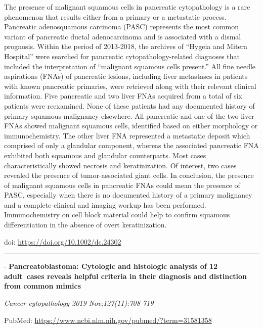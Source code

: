 \documentclass[
]{article}
\renewcommand{\linethickness}{0.05em}
\begin{document}
The presence of malignant squamous cells in pancreatic cytopathology is
a rare phenomenon that results either from a primary or a metastatic
process. Pancreatic adenosquamous carcinoma (PASC) represents the most
common variant of pancreatic ductal adenocarcinoma and is associated
with a dismal prognosis. Within the period of 2013-2018, the archives of
``Hygeia and Mitera Hospital'' were searched for pancreatic
cytopathology-related diagnoses that included the interpretation of
``malignant squamous cells present.'' All fine needle aspirations (FNAs)
of pancreatic lesions, including liver metastases in patients with known
pancreatic primaries, were retrieved along with their relevant clinical
information. Five pancreatic and two liver FNAs acquired from a total of
six patients were reexamined. None of these patients had any documented
history of primary squamous malignancy elsewhere. All pancreatic and one
of the two liver FNAs showed malignant squamous cells, identified based
on either morphology or immunochemistry. The other liver FNA represented
a metastatic deposit which comprised of only a glandular component,
whereas the associated pancreatic FNA exhibited both squamous and
glandular counterparts. Most cases characteristically showed necrosis
and keratinization. Of interest, two cases revealed the presence of
tumor-associated giant cells. In conclusion, the presence of malignant
squamous cells in pancreatic FNAs could mean the presence of PASC,
especially when there is no documented history of a primary malignancy
and a complete clinical and imaging workup has been performed.
Immunochemistry on cell block material could help to confirm squamous
differentiation in the absence of overt keratinization.

doi: \url{https://doi.org/10.1002/dc.24302}

\begin{center}\rule{0.5\linewidth}{\linethickness}\end{center}

- \textbf{Pancreatoblastoma: Cytologic and histologic analysis of 12
adult~cases reveals helpful criteria in their diagnosis and distinction
from common mimics}

\emph{Cancer cytopathology 2019 Nov;127(11):708-719}

PubMed: \url{https://www.ncbi.nlm.nih.gov/pubmed/?term=31581358}
\end{document}
